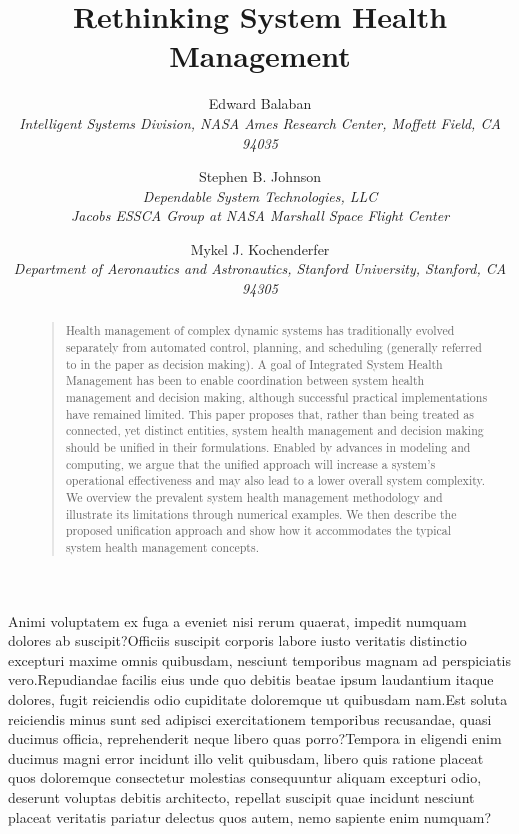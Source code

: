\documentclass[letterpaper]{article}
\theoremstyle{example}
\newcounter{examples}
\begin{document}
\title{Rethinking System Health Management}

\author{
  Edward Balaban \\
    {\normalsize\itshape
    Intelligent Systems Division, NASA Ames Research Center, Moffett Field, CA 94035}\\
		\and
	 Stephen B. Johnson \\
		{\normalsize\itshape
   Dependable System Technologies, LLC} \\
		{\normalsize\itshape
   Jacobs ESSCA Group at NASA Marshall Space Flight Center} \\
		\and
	 Mykel J. Kochenderfer \\
		{\normalsize\itshape
		Department of Aeronautics and Astronautics, Stanford University, Stanford, CA 94305} \\
	}
\date{}
\maketitle
\begin{abstract}
\begin{quote}
Health management of complex dynamic systems has traditionally evolved separately from automated control, planning, and scheduling (generally referred to in the paper as decision making). A goal of Integrated System Health Management has been to enable coordination between system health management and decision making, although successful practical implementations have remained limited. This paper proposes that, rather than being treated as connected, yet distinct entities, system health management and decision making should be unified in their formulations. Enabled by advances in modeling and computing, we argue that the unified approach will increase a system's operational effectiveness and may also lead to a lower overall system complexity. We overview the prevalent system health management methodology and illustrate its limitations through numerical examples. We then describe the proposed unification approach and show how it accommodates the typical system health management concepts.
\end{quote}
\end{abstract}








\fontsize{9.0pt}{10.0pt} \selectfont
Animi voluptatem ex fuga a eveniet nisi rerum quaerat, impedit numquam dolores ab suscipit?Officiis suscipit corporis labore iusto veritatis distinctio excepturi maxime omnis quibusdam, nesciunt temporibus magnam ad perspiciatis vero.Repudiandae facilis eius unde quo debitis beatae ipsum laudantium itaque dolores, fugit reiciendis odio cupiditate doloremque ut quibusdam nam.Est soluta reiciendis minus sunt sed adipisci exercitationem temporibus recusandae, quasi ducimus officia, reprehenderit neque libero quas porro?Tempora in eligendi enim ducimus magni error incidunt illo velit quibusdam, libero quis ratione placeat quos doloremque consectetur molestias consequuntur aliquam excepturi odio, deserunt voluptas debitis architecto, repellat suscipit quae incidunt nesciunt placeat veritatis pariatur delectus quos autem, nemo sapiente enim numquam?\clearpage


\end{document}
